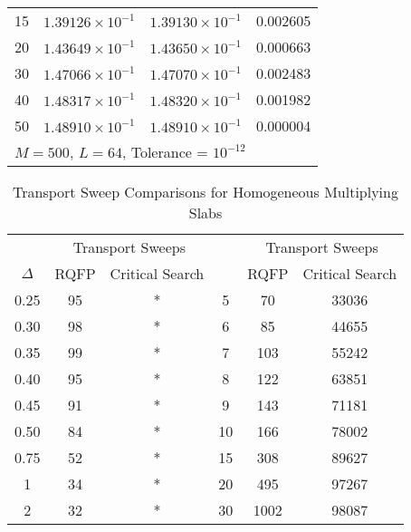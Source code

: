 \begin{table*}[!htbp]
\begin{tabular}{@{}cccc@{}}
15 & $1.39126 \times 10^{-1}$ & $1.39130 \times 10^{-1}$ & 0.002605 \\ 
20 & $1.43649 \times 10^{-1}$ & $1.43650 \times 10^{-1}$ & 0.000663 \\ 
30 & $1.47066 \times 10^{-1}$ & $1.47070 \times 10^{-1}$ & 0.002483 \\ 
40 & $1.48317 \times 10^{-1}$ & $1.48320 \times 10^{-1}$ & 0.001982 \\ 
50 & $1.48910 \times 10^{-1}$ & $1.48910 \times 10^{-1}$ & 0.000004 \\ 
\bottomrule
\multicolumn{4}{l}{$M = 500$, $L = 64$, Tolerance = $10^{-12}$} \\
\end{tabular}
\end{table*}

\begin{table}[!htbp]
	\caption{Transport Sweep Comparisons for Homogeneous Multiplying Slabs}
	\begin{subtable}[h]{1.0\textwidth}
	\centering{}
	\begin{tabular}{@{}cccccc@{}}\toprule
	& \multicolumn{2}{c}{Transport Sweeps} & & \multicolumn{2}{c}{Transport Sweeps} \\
	\cmidrule{2-3} \cmidrule{5-6} $\Delta$ & RQFP & Critical Search \quad &  \Delta & RQFP & Critical Search\\
	\midrule
	0.25 & 95 & * & 5 & 70 & 33036 \\
	0.30 & 98 & * & 6 & 85 & 44655 \\
	0.35 & 99 & * & 7 & 103 & 55242 \\
	0.40 & 95 & * & 8 & 122 & 63851 \\
	0.45 & 91 & * & 9 & 143 & 71181 \\
	0.50 & 84 & * & 10 & 166 & 78002 \\
	0.75 & 52 & * & 15 & 308 & 89627 \\
	1 & 34 & * & 20 & 495 & 97267 \\
	2 & 32 & * & 30 & 1002 & 98087 \\

\end{tabular}
\end{subtable}
\end{table}
